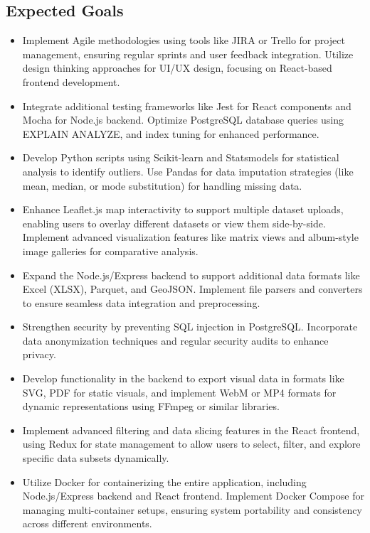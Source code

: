 \documentclass[12pt]{article}
\begin{document}
\subsection*{Expected Goals}
\begin{itemize}
    \item  Implement Agile methodologies using tools like JIRA or Trello for project management, ensuring regular sprints and user feedback integration. Utilize design thinking approaches for UI/UX design, focusing on React-based frontend development.
    \item Integrate additional testing frameworks like Jest for React components and Mocha for Node.js backend. Optimize PostgreSQL database queries using EXPLAIN ANALYZE, and index tuning for enhanced performance.
    \item Develop Python scripts using Scikit-learn and Statsmodels for statistical analysis to identify outliers. Use Pandas for data imputation strategies (like mean, median, or mode substitution) for handling missing data.
    \item Enhance Leaflet.js map interactivity to support multiple dataset uploads, enabling users to overlay different datasets or view them side-by-side. Implement advanced visualization features like matrix views and album-style image galleries for comparative analysis.
    \item Expand the Node.js/Express backend to support additional data formats like Excel (XLSX), Parquet, and GeoJSON. Implement file parsers and converters to ensure seamless data integration and preprocessing.
    \item Strengthen security by preventing SQL injection in PostgreSQL. Incorporate data anonymization techniques and regular security audits to enhance privacy.
    \item Develop functionality in the backend to export visual data in formats like SVG, PDF for static visuals, and implement WebM or MP4 formats for dynamic representations using FFmpeg or similar libraries.
    \item Implement advanced filtering and data slicing features in the React frontend, using Redux for state management to allow users to select, filter, and explore specific data subsets dynamically.
    \item Utilize Docker for containerizing the entire application, including Node.js/Express backend and React frontend. Implement Docker Compose for managing multi-container setups, ensuring system portability and consistency across different environments.
\end{itemize}
\end{document}
